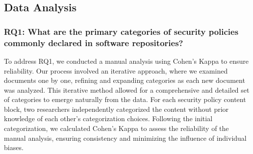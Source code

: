 


\subsection{Data Analysis} 

\subsubsection{RQ1: What are the primary categories of security policies commonly declared in software repositories?}

To address RQ1, we conducted a manual analysis using Cohen's Kappa \cite{Cohen} 
to ensure reliability. Our process involved an iterative approach, where we examined documents one by one, refining and expanding categories as each new document was analyzed. This iterative method allowed for a comprehensive and detailed set of categories to emerge naturally from the data. For each security policy content block, two researchers independently categorized the content without prior knowledge of each other's categorization choices. Following the initial categorization, we calculated Cohen's Kappa to assess the reliability of the manual analysis, ensuring consistency and minimizing the influence of individual biases. 

